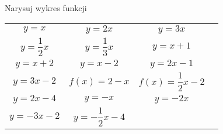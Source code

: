 \documentclass[a4paper,12pt,leqno,fleqn]{article}
\begin{document}
\newpage
Narysuj wykres funkcji

\begin{tabularx}{\linewidth}{@{}XX@{}XX@{}}

  \begin{equation}
    y=x
  \end{equation}
&
  \begin{equation}
    y=2x
  \end{equation}
&
  \begin{equation}
    y=3x
  \end{equation}
\\
  \begin{equation}
    y=\frac{1}{2}x
  \end{equation}
&
  \begin{equation}
    y=\frac{1}{3}x
  \end{equation}
&
  \begin{equation}
    y=x+1
  \end{equation}
\\
  \begin{equation}
    y=x+2
  \end{equation}
&
  \begin{equation}
    y=x-2
  \end{equation}
&
  \begin{equation}
    y=2x-1
  \end{equation}
\\
  \begin{equation}
    y=3x-2
  \end{equation}
&
  \begin{equation}
    f(x)=2-x
  \end{equation}
&
  \begin{equation}
    f(x)=\frac{1}{2}x-2
  \end{equation}
\\
  \begin{equation}
    y=2x-4
  \end{equation}
&
  \begin{equation}
    y=-x
  \end{equation}
&
  \begin{equation}
    y=-2x
  \end{equation}
\\
  \begin{equation}
    y=-3x-2
  \end{equation}
&
  \begin{equation}
    y=-\frac{1}{2}x-4
  \end{equation}

\end{tabularx}
\end{document}
